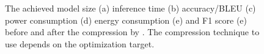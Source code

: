 \begin{figure}[!t]
\centering
{}
\hfill
{}
\hfill
{}
\hfill
{}
\hfill
{}
\hfill

\caption{The achieved model size (a) inference time (b) accuracy/BLEU (c) power consumption (d) 
energy consumption (e) and F1 score (e) before and after the compression by \pruning.
The compression technique to use depends on the optimization target.}
\label{fig:motivation}
\end{figure}